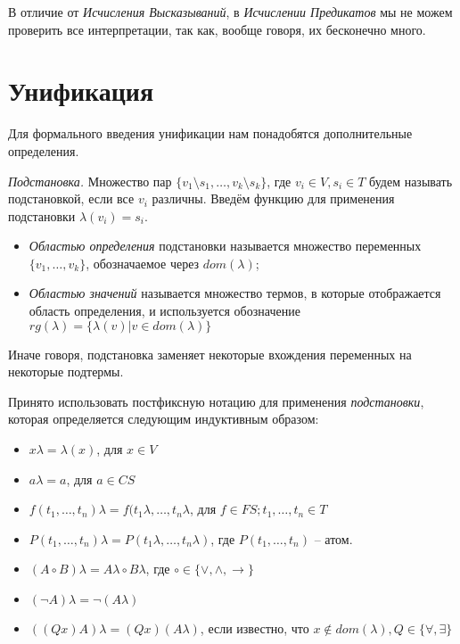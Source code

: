 В отличие от \textit{Исчисления Высказываний}, в \textit{Исчислении Предикатов} мы не можем проверить все интерпретации, так как, вообще говоря, их бесконечно много.\\

\section{Унификация}
Для формального введения унификации нам понадобятся дополнительные определения.

\begin{definition}
  \emph{Подстановка.} Множество пар $\{v_1 \setminus s_1, \ldots, v_k \setminus s_k\}$, где $v_i \in V, s_i \in T$ будем называть подстановкой, если все $v_i$ различны. Введём функцию для применения подстановки $\lambda(v_i) = s_i$.
\begin{itemize}  
  \item \emph{Областью определения} подстановки называется множество переменных $\{v_1, \ldots, v_k\}$, обозначаемое через $dom(\lambda)$; 
  \item \emph{Областью значений} называется множество термов, в которые отображается область определения, и используется обозначение $rg(\lambda) = \{\lambda(v) | v \in dom(\lambda)\}$
\end{itemize}
\end{definition}

Иначе говоря, подстановка заменяет некоторые вхождения переменных на некоторые подтермы.

Принято использовать постфиксную нотацию для применения \emph{подстановки}, которая определяется следующим индуктивным образом: 
\begin{itemize}
	\item $x\lambda = \lambda(x)$, для $x \in V$
    \item $a\lambda = a$, для $a \in CS$
    \item $f(t_1, \ldots, t_n)\lambda = f(t_1\lambda, \ldots, t_n\lambda$, для $f \in FS; t_1,\ldots,t_n \in T$
    \item $P(t_1, \ldots, t_n)\lambda = P(t_1\lambda, \ldots, t_n\lambda)$, где $P(t_1, \ldots, t_n)$ -- атом.
    \item $(A \circ B)\lambda = A\lambda \circ B\lambda$, где $\circ \in \{\vee, \wedge, \rightarrow\}$
    \item $(\neg A)\lambda = \neg(A\lambda)$
    \item $((Qx)A)\lambda = (Qx)(A\lambda)$, если известно, что $x \notin dom(\lambda), Q \in \{\forall, \exists\}$
\end{itemize}

